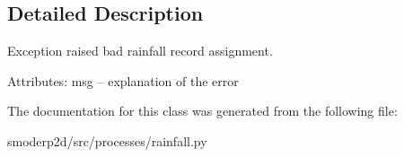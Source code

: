 \subsection{Detailed Description}
\begin{DoxyVerb}Exception raised bad rainfall record assignment.

Attributes:
    msg  -- explanation of the error
\end{DoxyVerb}
 

The documentation for this class was generated from the following file\-:\begin{DoxyCompactItemize}
\item 
smoderp2d/src/processes/rainfall.\-py\end{DoxyCompactItemize}

